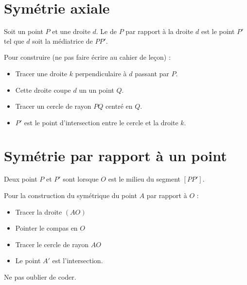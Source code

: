 


\section{Symétrie axiale}

\begin{definition}
    Soit un point \( P\) et une droite \( d\). Le  de \( P\) par rapport à la droite \( d\) est le point \( P'\) tel que \( d\) soit la médiatrice de \( PP'\).
\end{definition}

Pour construire (ne pas faire écrire au cahier de leçon) :
\begin{itemize}
    \item Tracer une droite \( k\) perpendiculaire à \( d\) passant par \( P\).
    \item Cette droite coupe \( d\) un un point \( Q\).
    \item Tracer un cercle de rayon \( PQ\) centré en \( Q\).
    \item \( P'\) est le point d'intersection entre le cercle et la droite \( k\).
\end{itemize}

\section{Symétrie par rapport à un point}



\begin{definition}
    Deux point \( P\) et \( P'\) sont  lorsque \( O\) est le milieu du segment \( [PP']\). 
\end{definition}

Pour la construction du symétrique du point \( A\) par rapport à \( O\) :
\begin{itemize}
    \item Tracer la droite \( (AO)\)
    \item Pointer le compas en \( O\)
    \item Tracer le cercle de rayon \( AO\)
    \item Le point \( A'\) est l'intersection.
\end{itemize}
Ne pas oublier de coder.

\begin{center}
    
\end{center}
